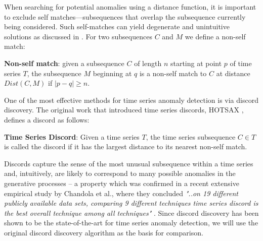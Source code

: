 \documentclass{llncs}
\begin{document}

When searching for potential anomalies using a distance function, it is important to exclude self matches---subsequences that overlap the subsequence currently being considered. Such self-matches can yield degenerate and unintuitive solutions as discussed in \cite{hot_sax}. For two subsequences $C$ and $M$ we define a non-self match:
\begin{definition}
\textbf{Non-self match}: given a subsequence $C$ of  length $n$ starting at point $p$ of  
time series $T$, the subsequence $M$ beginning at $q$ is a non-self match to $C$ at distance 
$Dist(C,M)$ if $|p-q| \geq n$.
\end{definition}

One of the most effective methods for time series anomaly detection is via discord discovery. The original work that introduced time series discords, HOTSAX \cite{hot_sax}, defines a discord as follows:

\begin{definition}
\textbf{Time Series Discord}: Given a time series $T$, the time series subsequence $C \in T$ is called the discord if it has the largest distance to its nearest non-self match.
\end{definition}


Discords capture the sense of the most unusual subsequence within a time series and, intuitively, are likely to correspond to many possible anomalies in the generative processes -- a property which was confirmed in a recent extensive empirical study by Chandola et al., where they concluded \textit{"..on 19 different publicly available data sets, comparing 9 different techniques time series discord is the best overall technique among all techniques"} \cite{chan_anomaly}. Since discord discovery has been shown to be the state-of-the-art for time series anomaly detection, we will use the original discord discovery algorithm as the basis for comparison. 
\end{document}
